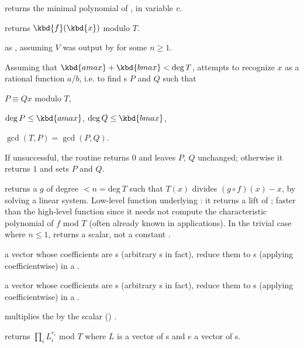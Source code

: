  returns the minimal
polynomial of , in variable $v$.

 returns $\kbd{f}(\kbd{x})$ modulo
$T$.

 as ,
assuming $V$ was output by  for some $n\geq 1$.

Assuming that $\kbd{amax}+\kbd{bmax}<\deg T$, attempts to recognize $x$ as a
rational function $a/b$, i.e. to find s $P$ and $Q$ such that

\item $P \equiv Q x$ modulo $T$,

\item $\deg P \leq \kbd{amax}$, $\deg Q \leq \kbd{bmax}$,

\item $\gcd(T,P) = \gcd(P,Q)$.

\noindent If unsuccessful, the routine returns $0$ and leaves $P$, $Q$
unchanged; otherwise it returns $1$ and sets $P$ and $Q$.

 returns a  $g$ of degree $< n
= \text{deg}~T$ such that $T(x)$ divides $(g \circ f)(x) - x$, by solving a
linear system. Low-level function underlying : it returns a
lift of \kbd[modreverse(f,T)]; faster than the high-level function since it
needs not compute the characteristic polynomial of $f$ mod $T$ (often already
known in applications). In the trivial case where $n \leq 1$, returns a
scalar, not a constant .


  a vector whose
coefficients are s (arbitrary s in fact), reduce them to
s (applying  coefficientwise) in a .

  a vector whose
coefficients are s (arbitrary s in fact), reduce them to
s (applying  coefficientwise) in a .

  multiplies the
   by the scalar () .

 returns
$\prod_i L_i^{e_i}$ mod $T$ where $L$ is a vector of s and
$e$ a vector of s.

